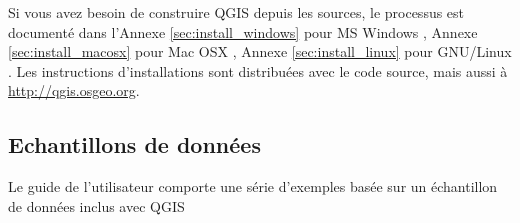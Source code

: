 Si vous avez besoin de construire QGIS depuis les sources, le processus est documenté dans l'Annexe 
\ref{sec:install_windows} pour MS Windows \win, Annexe 
\ref{sec:install_macosx} pour Mac OSX \osx, Annexe \ref{sec:install_linux} pour GNU/Linux \nix. Les instructions d'installations sont distribuées avec le code source, mais aussi à \url{http://qgis.osgeo.org}.

%
%
%

\subsection{Echantillons de données}\label{label_sampledata}  

Le guide de l'utilisateur comporte une série d'exemples basée sur un échantillon de données inclus avec QGIS

